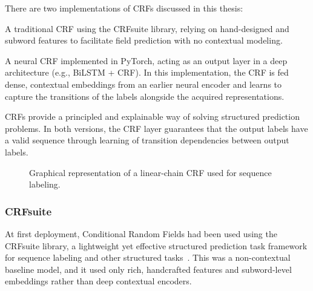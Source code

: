 There are two implementations of CRFs discussed in this thesis:
\begin{compactitem}
\item A traditional CRF using the CRFsuite library, relying on hand-designed and subword features to facilitate field prediction with no contextual modeling.
\item A neural CRF implemented in PyTorch, acting as an output layer in a deep architecture (e.g., BiLSTM + CRF). In this implementation, the CRF is fed dense, contextual embeddings from an earlier neural encoder and learns to capture the transitions of the labels alongside the acquired representations.
\end{compactitem}
CRFs provide a principled and explainable way of solving structured prediction problems. In both versions, the CRF layer guarantees that the output labels have a valid sequence through learning of transition dependencies between output labels.
\begin{figure}[ht]
    \centering
    
    \caption[Linear-Chain CRF for Sequence Labeling]{Graphical representation of a linear-chain CRF used for sequence labeling.}
    \label{fig:crf-chain}
\end{figure}

\subsubsection{CRFsuite}
At first deployment, Conditional Random Fields had been used using the CRFsuite library, a lightweight yet effective structured prediction task framework for sequence labeling and other structured tasks~\cite{pythoncrfsuite}. This was a non-contextual baseline model, and it used only rich, handcrafted features and subword-level embeddings rather than deep contextual encoders.

